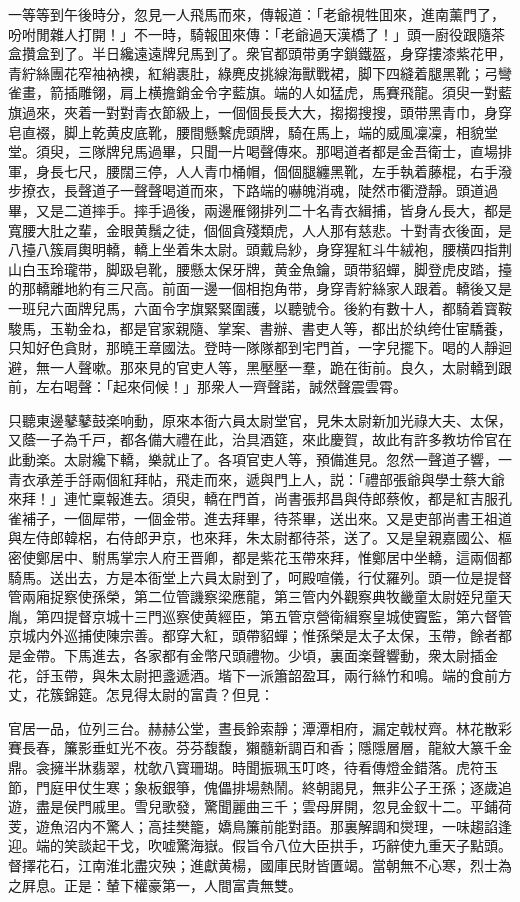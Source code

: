 一等等到午後時分，忽見一人飛馬而來，傳報道：「老爺視牲囬來，進南薰門了，吩咐閒雜人打開！」不一時，騎報囬來傳：「老爺過天漢橋了！」頭一廚役跟隨茶盒攢盒到了。半日纔遠遠牌兒馬到了。衆官都頭带勇字鎖鐵盔，身穿摟漆紫花甲，青紵絲團花窄袖衲襖，紅綃裹肚，綠麂皮挑線海獸戰裙，脚下四縫着腿黑靴；弓彎雀畫，箭插雕翎，肩上横擔銷金令字藍旗。端的人如猛虎，馬賽飛龍。須臾一對藍旗過來，夾着一對對青衣節級上，一個個長長大大，搊搊搜搜，頭带黑青巾，身穿皂直裰，脚上乾黄皮底靴，腰間懸繫虎頭牌，騎在馬上，端的威風凜凜，相貌堂堂。須臾，三隊牌兒馬過畢，只聞一片喝聲傳來。那喝道者都是金吾衛士，直場排軍，身長七尺，腰闊三停，人人青巾桶帽，個個腿纏黑靴，左手執着藤棍，右手潑步撩衣，長聲道子一聲聲喝道而來，下路端的嚇魄消魂，陡然市衢澄靜。頭道過畢，又是二道摔手。摔手過後，兩邊雁翎排列二十名青衣緝捕，皆身ん長大，都是寬腰大肚之輩，金眼黄鬚之徒，個個貪殘類虎，人人那有慈悲。十對青衣後面，是八擡八簇肩輿明轎，轎上坐着朱太尉。頭戴烏紗，身穿猩紅斗牛絨袍，腰横四指荆山白玉玲瓏带，脚趿皂靴，腰懸太保牙牌，黄金魚鑰，頭带貂蟬，脚登虎皮踏，擡的那轎離地約有三尺高。前面一邊一個相抱角带，身穿青紵絲家人跟着。轎後又是一班兒六面牌兒馬，六面令字旗緊緊圍護，以聽號令。後約有數十人，都騎着寳鞍駿馬，玉勒金ね，都是官家親隨、掌案、書辦、書吏人等，都出於纨绔仕宦驕養，只知好色貪財，那曉王章國法。登時一隊隊都到宅門首，一字兒擺下。喝的人靜迴避，無一人聲嗽。那來見的官吏人等，黑壓壓一羣，跪在街前。良久，太尉轎到跟前，左右喝聲：「起來伺候！」那衆人一齊聲諾，誠然聲震雲霄。

只聽東邊鼕鼕鼓楽响動，原來本衙六員太尉堂官，見朱太尉新加光祿大夫、太保，又蔭一子為千戸，都各備大禮在此，治具酒筵，來此慶賀，故此有許多教坊伶官在此動楽。太尉纔下轎，樂就止了。各項官吏人等，預備進見。忽然一聲道子響，一青衣承差手㧱兩個紅拜帖，飛走而來，遞與門上人，説：「禮部張爺與學士蔡大爺來拜！」連忙稟報進去。須臾，轎在門首，尚書張邦昌與侍郎蔡攸，都是紅吉服孔雀補子，一個犀带，一個金带。進去拜畢，待茶畢，送出來。又是吏部尚書王祖道與左侍郎韓梠，右侍郎尹京，也來拜，朱太尉都待茶，送了。又是皇親嘉國公、樞密使鄭居中、駙馬掌宗人府王晋卿，都是紫花玉帶來拜，惟鄭居中坐轎，這兩個都騎馬。送出去，方是本衙堂上六員太尉到了，呵殿喧儀，行仗羅列。頭一位是提督管兩廂捉察使孫榮，第二位管譏察梁應龍，第三管内外觀察典牧畿童太尉姪兒童天胤，第四提督京城十三門巡察使黄經臣，第五管京營衛緝察皇城使竇監，第六督管京城内外巡捕使陳宗善。都穿大紅，頭帶貂蟬；惟孫榮是太子太保，玉帶，餘者都是金帶。下馬進去，各家都有金幣尺頭禮物。少頃，裏面楽聲響動，衆太尉插金花，㧱玉帶，與朱太尉把盞遞酒。堦下一派簫韶盈耳，兩行絲竹和鳴。端的食前方丈，花簇錦筵。怎見得太尉的富貴？但見：

官居一品，位列三台。赫赫公堂，晝長鈴索靜；潭潭相府，漏定戟杖齊。林花散彩賽長春，簾影垂虹光不夜。芬芬馥馥，獺髓新調百和香；隱隱層層，龍紋大篆千金鼎。衾擁半牀翡翠，枕欹八寳珊瑚。時聞振珮玉叮咚，待看傳燈金錯落。虎符玉節，門庭甲仗生寒；象板銀箏，傀儡排場熱鬧。終朝謁見，無非公子王孫；逐歲追遊，盡是侯門戚里。雪兒歌發，驚聞麗曲三千；雲母屏開，忽見金釵十二。平鋪荷芰，遊魚沼内不驚人；高挂樊籠，嬌鳥簾前能對語。那裏解調和爕理，一味趨諂逢迎。端的笑談起干戈，吹嘘驚海嶽。假旨令八位大臣拱手，巧辭使九重天子點頭。督擇花石，江南淮北盡灾殃；進獻黄楊，國庫民財皆匱竭。當朝無不心寒，烈士為之屛息。正是：輦下權豪第一，人間富貴無雙。

